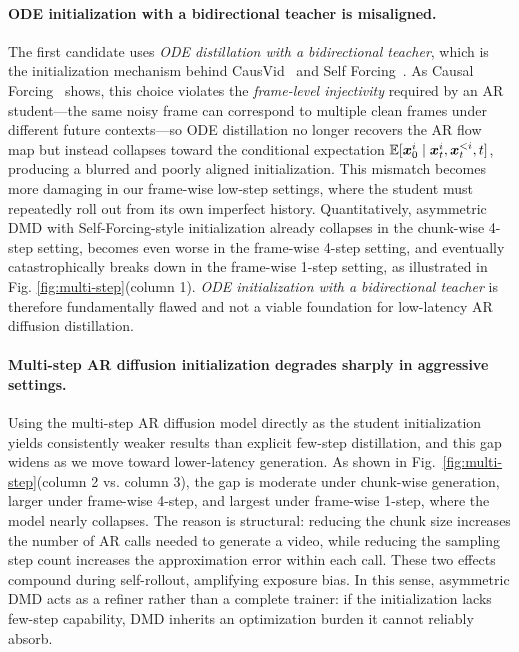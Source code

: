 



\paragraph{ODE initialization with a bidirectional teacher is misaligned.}

The first candidate uses \emph{ODE distillation with a bidirectional teacher}, which is the initialization mechanism behind CausVid~\cite{yin2025slow} and Self Forcing~\cite{huang2025self}. As Causal Forcing~\cite{zhu2026causal} shows, this choice violates the \emph{frame-level injectivity} required by an AR student---the same noisy frame can correspond to multiple clean frames under different future contexts---so ODE distillation no longer recovers the AR flow map but instead collapses toward the conditional expectation $\mathbb{E}[{\bm{x}}_0^i \mid {\bm{x}}_t^i, {\bm{x}}_t^{<i}, t]$, producing a blurred and poorly aligned initialization. This mismatch becomes more damaging in our frame-wise low-step settings, where the student must repeatedly roll out from its own imperfect history. Quantitatively, asymmetric DMD with Self-Forcing-style initialization already collapses in the chunk-wise 4-step setting, becomes even worse in the frame-wise 4-step setting, and eventually catastrophically breaks down in the frame-wise 1-step setting, as illustrated in Fig. \ref{fig:multi-step}(column 1). \emph{ODE initialization with a bidirectional teacher} is therefore fundamentally flawed and not a viable foundation for low-latency AR diffusion distillation.

\paragraph{Multi-step AR diffusion initialization degrades sharply in aggressive settings.} Using the multi-step AR diffusion model directly as the student initialization yields consistently weaker results than explicit few-step distillation, and this gap widens as we move toward lower-latency generation. As shown in Fig.~\ref{fig:multi-step}(column 2 vs. column 3), the gap is moderate under chunk-wise generation, larger under frame-wise 4-step, and largest under frame-wise 1-step, where the model nearly collapses. The reason is structural: reducing the chunk size increases the number of AR calls needed to generate a video, while reducing the sampling step count increases the approximation error within each call. These two effects compound during self-rollout, amplifying exposure bias. In this sense, asymmetric DMD acts as a refiner rather than a complete trainer: if the initialization lacks few-step capability, DMD inherits an optimization burden it cannot reliably absorb.



